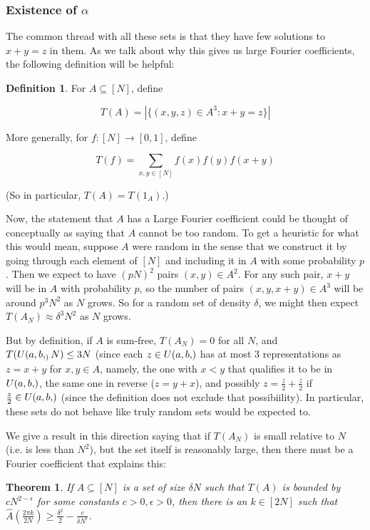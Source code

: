 \documentclass{article}
\newtheorem{theorem}{Theorem}[section]
\theoremstyle{definition}
\newtheorem{definition}{Definition}
\theoremstyle{remark}
\numberwithin{equation}{section}
\begin{document}
\subsubsection{Existence of $\alpha$}

The common thread with all these \relevant sets is that they have few
solutions to $x+y=z$ in them.  As we talk about why this gives us
large Fourier coefficients, the following definition will be helpful:

\begin{definition}
  For $A \subseteq [N]$, define
  
  \[T(A) = \left|\{(x,y,z) \in A^3 : x+y=z\}\right|\]

  More generally, for $f : [N] \to [0,1]$, define

  \[T(f) = \sum_{x,y \in [N]} f(x)f(y)f(x+y)\]

  (So in particular, $T(A) = T(1_A)$.)
\end{definition}

Now, the statement that $A$ has a Large Fourier coefficient could be
thought of conceptually as saying that $A$ cannot be too random.  To
get a heuristic for what this would mean, suppose $A$ were random in
the sense that we construct it by going through each element of $[N]$
and including it in $A$ with some probability $p$.  Then we expect to
have $(pN)^2$ pairs $(x, y) \in A^2$.  For any such pair, $x+y$ will
be in $A$ with probability $p$, so the number of pairs
$(x, y, x+y) \in A^3$ will be around $p^3 N^2$ as $N$ grows.  So for a
random set of density $\delta$, we might then expect
$T(A_N) \approx \delta^3 N^2$ as $N$ grows.  

But by definition, if $A$ is sum-free, $T(A_N) = 0$ for all $N$, and
$T(U(a,b,_)N) \leq 3N$ (since each $z \in \ulam{a,b}$ has at most 3
representations as $z = x+y$ for $x,y \in A$, namely, the one with
$x < y$ that qualifies it to be in $\ulam{a,b}$, the same one in
reverse ($z = y+x$), and possibly $z = \frac{z}{2} + \frac{z}{2}$ if
$\frac{z}{2} \in \ulam{a,b}$ (since the definition does not exclude
that possibiility).  In particular, these sets do not behave like
truly random sets would be expected to.  

We give a result in this direction saying that if $T(A_N)$ is small
relative to $N$ (i.e. is less than $N^2$), but the set itself is
reasonably large, then there must be a Fourier coefficient that
explains this: 

\begin{theorem}\label{thm:alpha_finitary}
  If $A \subseteq [N]$ is a set of size $\delta N$ such that $T(A)$ is
  bounded by $c N^{2-\epsilon}$ for some constants
  $c > 0, \epsilon > 0$, then there is an $k \in [2N]$ such that
  $\widehat{A}(\frac{2\pi k}{2N}) \geq \frac{\delta^2}{2} - \frac{c}{\delta
    N^\epsilon}$.
\end{theorem}
\end{document}
